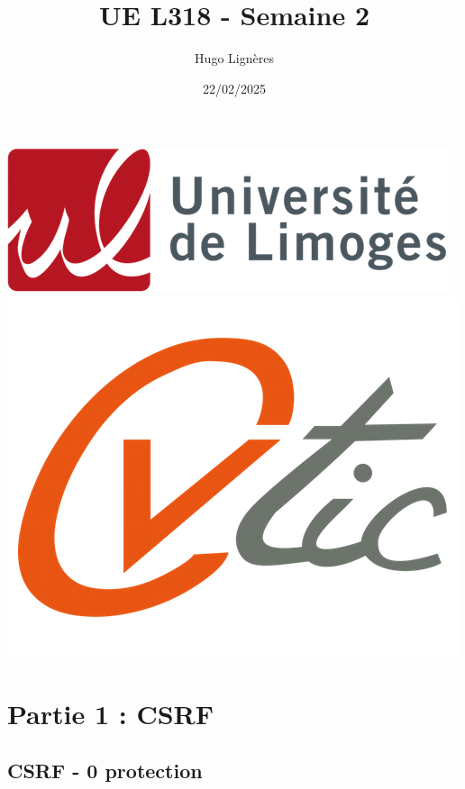 \documentclass[12pt,a4paper]{article}
\title{UE L318 - Semaine 2}
\author{Hugo Lignères}
\date{22/02/2025}
\begin{document}
\maketitle

\hrulefill
\vspace{6cm}
\begin{center}
	\includegraphics[scale=.4]{../../images/univ.png}
		\\
		\vspace{2cm}
	\includegraphics[scale=.25]{../../images/cvtic.png}
\end{center}


\newpage

\tableofcontents

\newpage

\section{Partie 1 : CSRF}

	\subsection{CSRF - 0 protection}
	
\end{document}
